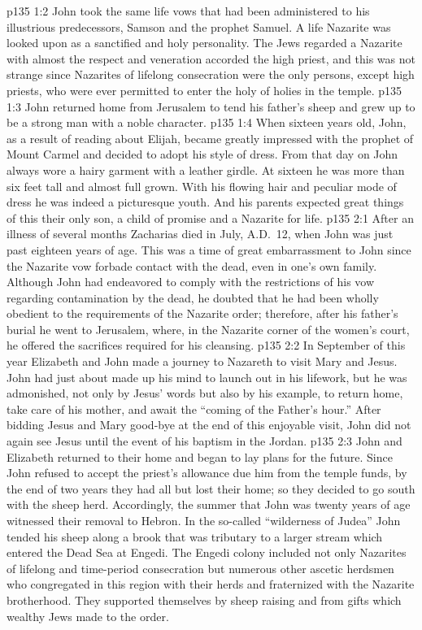 \vs p135 1:2 John took the same life vows that had been administered to his illustrious predecessors, Samson and the prophet Samuel. A life Nazarite was looked upon as a sanctified and holy personality. The Jews regarded a Nazarite with almost the respect and veneration accorded the high priest, and this was not strange since Nazarites of lifelong consecration were the only persons, except high priests, who were ever permitted to enter the holy of holies in the temple.
\pc \vs p135 1:3 John returned home from Jerusalem to tend his father’s sheep and grew up to be a strong man with a noble character.
\vs p135 1:4 When sixteen years old, John, as a result of reading about Elijah, became greatly impressed with the prophet of Mount Carmel and decided to adopt his style of dress. From that day on John always wore a hairy garment with a leather girdle. At sixteen he was more than six feet tall and almost full grown. With his flowing hair and peculiar mode of dress he was indeed a picturesque youth. And his parents expected great things of this their only son, a child of promise and a Nazarite for life.
\vs p135 2:1 After an illness of several months Zacharias died in July, A.D.~12, when John was just past eighteen years of age. This was a time of great embarrassment to John since the Nazarite vow forbade contact with the dead, even in one’s own family. Although John had endeavored to comply with the restrictions of his vow regarding contamination by the dead, he doubted that he had been wholly obedient to the requirements of the Nazarite order; therefore, after his father’s burial he went to Jerusalem, where, in the Nazarite corner of the women’s court, he offered the sacrifices required for his cleansing.
\pc \vs p135 2:2 In September of this year Elizabeth and John made a journey to Nazareth to visit Mary and Jesus. John had just about made up his mind to launch out in his lifework, but he was admonished, not only by Jesus’ words but also by his example, to return home, take care of his mother, and await the “coming of the Father’s hour.” After bidding Jesus and Mary good\hyp{}bye at the end of this enjoyable visit, John did not again see Jesus until the event of his baptism in the Jordan.\plusone
\vs p135 2:3 John and Elizabeth returned to their home and began to lay plans for the future. Since John refused to accept the priest’s allowance due him from the temple funds, by the end of two years they had all but lost their home; so they decided to go south with the sheep herd. Accordingly, the summer that John was twenty years of age witnessed their removal to Hebron. In the so\hyp{}called “wilderness of Judea” John tended his sheep along a brook that was tributary to a larger stream which entered the Dead Sea at Engedi. The Engedi colony included not only Nazarites of lifelong and time\hyp{}period consecration but numerous other ascetic herdsmen who congregated in this region with their herds and fraternized with the Nazarite brotherhood. They supported themselves by sheep raising and from gifts which wealthy Jews made to the order.
